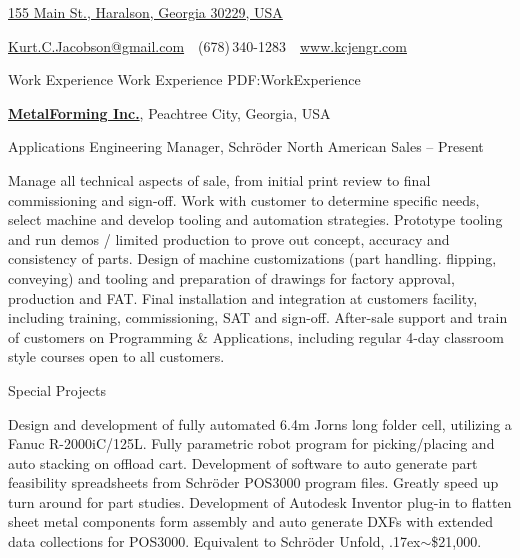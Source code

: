 \documentclass[
letterpaper,
MMMyyyy,
nonstopmode,
draftmode,
]{resume}
\makeatletter
\newcommand{\CVAuthor}{Kurt C. Jacobson}
\newcommand{\CVWebpage}{www.kcjengr.com}
\newcommand{\CVEmail}{Kurt.C.Jacobson@gmail.com}
\makeatother
\begin{document}

\Title{\CVAuthor}

\begin{SubTitle}
\href{https://www.google.com/maps/place/155+Main+St,+Haralson,+GA+30229/}
{155 Main St., Haralson, Georgia 30229, USA}
\par
\href{mailto:\CVEmail}
{\CVEmail}
\,\SubBulletSymbol\,
(678)\,340-1283
\,\SubBulletSymbol\,
\href{\CVWebpage}
{\url{\CVWebpage}}
\end{SubTitle}

\begin{Body}



\Section
{Work Experience}
{Work Experience}
{PDF:WorkExperience}


\Entry
\href{http://www.metalforming-usa.net/}
{\textbf{MetalForming Inc.}},
Peachtree City, Georgia, USA

\Gap
\BulletItem
Applications Engineering Manager,
Schr{\"o}der North American Sales
\hfill
{} --
Present
\begin{Detail}
\SubBulletItem
Manage all technical aspects of sale, from initial print review to final commissioning and sign-off.
\SubBulletItem
Work with customer to determine specific needs, select machine and develop tooling and automation strategies.
\SubBulletItem
Prototype tooling and run demos / limited production to prove out concept, accuracy and consistency of parts.
\SubBulletItem
Design of machine customizations (part handling. flipping, conveying) and tooling and preparation of drawings for factory approval, production and FAT.
\SubBulletItem
Final installation and integration at customers facility, including training, commissioning, SAT and sign-off.
\SubBulletItem
After-sale support and train of customers on Programming {\&} Applications, including regular 4-day classroom style courses open to all customers.
\end{Detail}

\Gap
\BulletItem
Special Projects
\hfill
\begin{Detail}
\SubBulletItem
Design and development of fully automated 6.4m Jorns long folder cell, utilizing a Fanuc R-2000iC/125L. Fully parametric robot program for picking/placing and auto stacking on offload cart.
\SubBulletItem
Development of software to auto generate part feasibility spreadsheets from Schr{\"o}der POS3000 program files. Greatly speed up turn around for part studies.
\SubBulletItem
Development of Autodesk Inventor plug-in to flatten sheet metal components form assembly and auto generate DXFs with extended data collections for POS3000. Equivalent to  Schr{\"o}der Unfold, {\raise.17ex\hbox{$\scriptstyle\mathtt{\sim}$}}{\$}21,000.
\end{Detail}


\end{Body}
\end{document}
